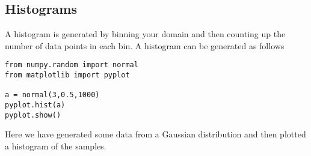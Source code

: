 \subsection*{Histograms}

A histogram is generated by binning your domain and then counting up
the number of data points in each bin.  A histogram can be generated
as follows
\begin{Verbatim}
from numpy.random import normal
from matplotlib import pyplot

a = normal(3,0.5,1000)
pyplot.hist(a)
pyplot.show()
\end{Verbatim}
 Here we have generated some data from a Gaussian distribution and then
plotted a histogram of the samples.





